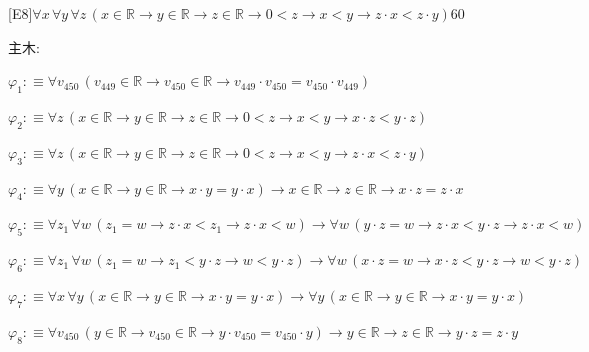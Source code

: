 \begin{fullproof}{[E8]}{$\forall x\,\forall y\,\forall z\,(x \in \mathbb{R} \to y \in \mathbb{R} \to z \in \mathbb{R} \to 0 < z \to x < y \to z \cdot x < z \cdot y)$}{60}
\begin{ptree}
\end{ptree}
\noindent 主木:
\begin{ptree}
\noLine
{}
\end{ptree}
\begin{abbrevlist}
\item $\varphi_{1} :\equiv \forall v_{450}\,(v_{449} \in \mathbb{R} \to v_{450} \in \mathbb{R} \to v_{449} \cdot v_{450} = v_{450} \cdot v_{449})$
\item $\varphi_{2} :\equiv \forall z\,(x \in \mathbb{R} \to y \in \mathbb{R} \to z \in \mathbb{R} \to 0 < z \to x < y \to x \cdot z < y \cdot z)$
\item $\varphi_{3} :\equiv \forall z\,(x \in \mathbb{R} \to y \in \mathbb{R} \to z \in \mathbb{R} \to 0 < z \to x < y \to z \cdot x < z \cdot y)$
\item $\varphi_{4} :\equiv \forall y\,(x \in \mathbb{R} \to y \in \mathbb{R} \to x \cdot y = y \cdot x) \to x \in \mathbb{R} \to z \in \mathbb{R} \to x \cdot z = z \cdot x$
\item $\varphi_{5} :\equiv \forall z_{1}\,\forall w\,(z_{1} = w \to z \cdot x < z_{1} \to z \cdot x < w) \to \forall w\,(y \cdot z = w \to z \cdot x < y \cdot z \to z \cdot x < w)$
\item $\varphi_{6} :\equiv \forall z_{1}\,\forall w\,(z_{1} = w \to z_{1} < y \cdot z \to w < y \cdot z) \to \forall w\,(x \cdot z = w \to x \cdot z < y \cdot z \to w < y \cdot z)$
\item $\varphi_{7} :\equiv \forall x\,\forall y\,(x \in \mathbb{R} \to y \in \mathbb{R} \to x \cdot y = y \cdot x) \to \forall y\,(x \in \mathbb{R} \to y \in \mathbb{R} \to x \cdot y = y \cdot x)$
\item $\varphi_{8} :\equiv \forall v_{450}\,(y \in \mathbb{R} \to v_{450} \in \mathbb{R} \to y \cdot v_{450} = v_{450} \cdot y) \to y \in \mathbb{R} \to z \in \mathbb{R} \to y \cdot z = z \cdot y$

\end{abbrevlist}
\end{fullproof}
